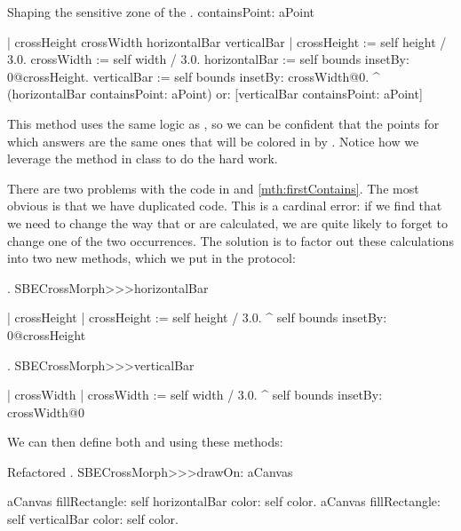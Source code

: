 \documentclass[a4paper,10pt,twoside]{book}
\begin{document}

\begin{method}[firstContains]{Shaping the sensitive zone of the .}
containsPoint: aPoint

	| crossHeight crossWidth horizontalBar verticalBar |
	crossHeight := self height / 3.0.
	crossWidth := self width / 3.0.
	horizontalBar := self bounds insetBy: 0@crossHeight.
	verticalBar := self bounds insetBy: crossWidth@0.
	^ (horizontalBar containsPoint: aPoint)
		or: [verticalBar containsPoint: aPoint]
\end{method}

This method uses the same logic as , so we can be confident that the points for which  answers  are the same ones that will be colored in by .
Notice how we leverage the  method in class  to do the hard work.

There are two problems with the code in  and \ref{mth:firstContains}.
The most obvious is that we have duplicated code.
This is a cardinal error: if we find that we need to change the way that  or  are calculated, we are quite likely to forget to change one of the two occurrences.
The solution is to factor out these calculations into two new methods, which we put in the  protocol:

\begin{method}{.}
SBECrossMorph>>>horizontalBar

	| crossHeight |
	crossHeight := self height / 3.0.
	^ self bounds insetBy: 0@crossHeight
\end{method}

\begin{method}{.}
SBECrossMorph>>>verticalBar

	| crossWidth |
	crossWidth := self width / 3.0.
	^ self bounds insetBy: crossWidth@0
\end{method}

\noindent
We can then define both  and  using these methods:

\begin{method}{Refactored .}
SBECrossMorph>>>drawOn: aCanvas 

	aCanvas fillRectangle: self horizontalBar color: self color.
	aCanvas fillRectangle: self verticalBar color: self color.
\end{method}
\end{document}
